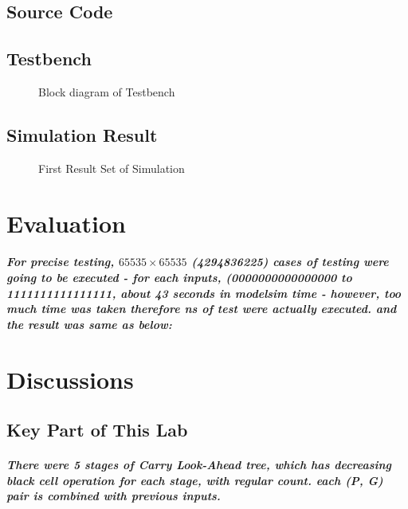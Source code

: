 \documentclass[a4paper]{report}
\begin{document}
        \section{Source Code}
            
        \section{Testbench}
            \begin{figure}[!htb]
                \centering
                \caption {Block diagram of Testbench}
                \label{fig:wf-0}
            \end{figure}
            

        \section{Simulation Result}
            \begin{figure}[!htb]
                \centering
                \caption {First Result Set of Simulation}
                \label{fig:wf-1}
            \end{figure}

    \chapter{Evaluation}
        \paragraph{\normalfont For precise testing, $65535 \times 65535$ (4294836225) cases of testing were going to be executed - for each inputs, (0000000000000000 to 1111111111111111, about 43 seconds in modelsim time - however, too much time was taken therefore ns of test were actually executed. and the result was same as below:}


    \chapter{Discussions}
        \section{Key Part of This Lab}
            \paragraph{\normalfont There were 5 stages of Carry Look-Ahead tree, which has decreasing black cell operation for each stage, with regular count. each (P, G) pair is combined with previous inputs.}
\end{document}
